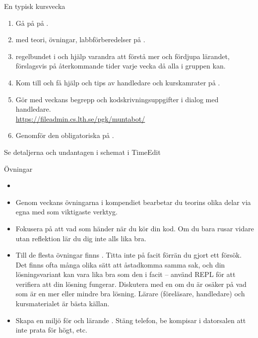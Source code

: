 \fi %

\begin{Slide}{En typisk kursvecka}
\begin{enumerate}
\item Gå på  på .
\item {}  med teori, övningar, labbförberedelser på  .
\item {} regelbundet i  och hjälp varandra att förstå mer och fördjupa lärandet, förslagsvis på återkommande tider varje vecka då alla i gruppen kan.
\item Kom till  och få hjälp och tips av handledare och kurskamrater på .
\item Gör  med veckans begrepp och kodskrivningsuppgifter i dialog med handledare.\\\url{https://fileadmin.cs.lth.se/pgk/muntabot/}
\item Genomför den obligatoriska  på .
\end{enumerate}
Se detaljerna och undantagen i schemat i TimeEdit
\end{Slide}

\ifkompendium\else  %
\begin{SlideExtra}{Övningar}\SlideFontSmall
\begin{itemize}
  \item {}

\item Genom veckans övningarna i kompendiet bearbetar du teorins olika delar via egna  med  som viktigaste verktyg.

\item Fokusera på att  vad som händer när du kör din kod. Om du bara rusar vidare utan reflektion lär du dig inte alls lika bra.

\item Till de flesta övningar finns . Titta inte på facit förrän du  gjort ett försök. Det finns ofta många olika sätt att åstadkomma samma sak, och din lösningsvariant kan vara lika bra som den i facit -- använd REPL för att verifiera att din lösning fungerar. Diskutera med en  om du är osäker på vad som är en mer eller mindre bra lösning. Lärare (föreläsare, handledare) och kursmaterialet är bästa källan.

\item Skapa en miljö för  och lärande . Stäng telefon, be kompisar i datorsalen att inte prata för högt, etc.
\end{itemize}
\end{SlideExtra}

